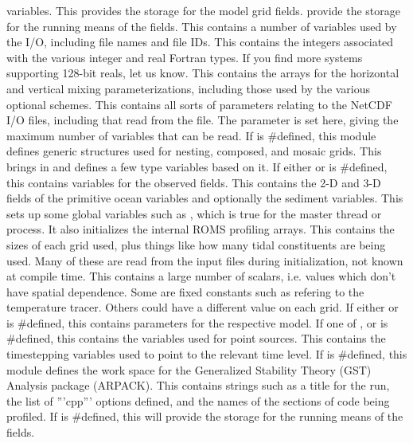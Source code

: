 \begin{klist}
    variables.
   This provides the storage for the model grid fields. 
    provide the storage for the running means of the fields.
   This contains a number of variables used by the
    I/O, including file names and file IDs.
    This contains the integers associated with the
    various integer and real Fortran types. If you find more systems
    supporting 128-bit reals, let us know.
   This contains the arrays for the horizontal and
    vertical mixing parameterizations, including those used by the various
    optional schemes.
   This contains all sorts of parameters relating to
    the NetCDF I/O files, including that read from the 
    file. The parameter  is set here, giving the maximum number of
    variables that can be read.
   If  is #defined, this module defines
    generic structures used for nesting, composed, and mosaic grids.
   This brings in  and defines a few
    type variables based on it.
   If either  or 
    is #defined, this contains variables for the observed fields.
   This contains the 2-D and 3-D fields of the primitive
  ocean variables and optionally the sediment variables.
   This sets up some global variables such as
    , which is true for the master thread or
    process. It also initializes the internal ROMS profiling arrays.
   This contains the sizes of each grid used, plus
    things like how many tidal constituents are being used. Many of these are
    read from the input files during initialization, not known at compile
    time.
   This contains a large number of scalars, i.e. values
    which don't have spatial dependence. Some are fixed constants such
    as  refering to the temperature tracer. Others could
    have a different value on each grid.
   If either  or 
    is #defined, this contains parameters for the respective model.
   If one of , 
    or  is #defined, this contains the variables used
    for point sources.
   This contains the timestepping variables used to
    point to the relevant time level.
   If  is
    #defined, this module defines the work space for the Generalized
    Stability Theory (GST) Analysis package (ARPACK).
   This contains strings such as a title for the run,
    the list of '''cpp''' options defined, and the names of the sections of
    code being profiled.
    If  is #defined, this will
    provide the storage for the running means of the fields.
\end{klist}
